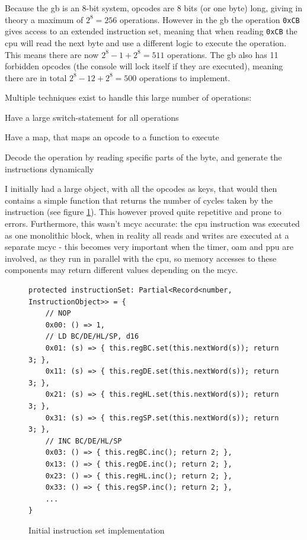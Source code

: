 \documentclass[11pt]{report}
\begin{document}
Because the \glsdesc{gb} is an 8-bit system, opcodes are 8 bits (or one byte) long, giving in theory a maximum of $2^8=256$ operations. However in the \gls{gb} the operation \texttt{0xCB} gives access to an extended instruction set, meaning that when reading \texttt{0xCB} the \gls{cpu} will read the next byte and use a different logic to execute the operation. This means there are now $2^8 - 1 + 2^8=511$ operations. The \gls{gb} also has 11 forbidden opcodes (the console will lock itself if they are executed), meaning there are in total $2^8 - 12 + 2^8 = 500$ operations to implement.

Multiple techniques exist to handle this large number of operations:

\begin{compactitem}
    \item Have a large switch-statement for all operations
    \item Have a map, that maps an opcode to a function to execute
    \item Decode the operation by reading specific parts of the byte, and generate the instructions dynamically
\end{compactitem}

I initially had a large object, with all the opcodes as keys, that would then contains a simple function that returns the number of cycles taken by the instruction (see figure \ref{fig:instset-first}). This however proved quite repetitive and prone to errors. Furthermore, this wasn't \gls{mcyc} accurate: the \gls{cpu} instruction was executed as one monolithic block, when in reality all reads and writes are executed at a separate \gls{mcyc} - this becomes very important when the timer, \gls{oam} and \gls{ppu} are involved, as they run in parallel with the \gls{cpu}, so memory accesses to these components may return different values depending on the \gls{mcyc}.

\begin{figure}[h]
    \begin{verbatim}
protected instructionSet: Partial<Record<number, InstructionObject>> = {
    // NOP
    0x00: () => 1,
    // LD BC/DE/HL/SP, d16
    0x01: (s) => { this.regBC.set(this.nextWord(s)); return 3; },
    0x11: (s) => { this.regDE.set(this.nextWord(s)); return 3; },
    0x21: (s) => { this.regHL.set(this.nextWord(s)); return 3; },
    0x31: (s) => { this.regSP.set(this.nextWord(s)); return 3; },
    // INC BC/DE/HL/SP
    0x03: () => { this.regBC.inc(); return 2; },
    0x13: () => { this.regDE.inc(); return 2; },
    0x23: () => { this.regHL.inc(); return 2; },
    0x33: () => { this.regSP.inc(); return 2; },
    ...
}
    \end{verbatim}
    \caption{Initial instruction set implementation}
    \label{fig:instset-first}
\end{figure}
\end{document}
